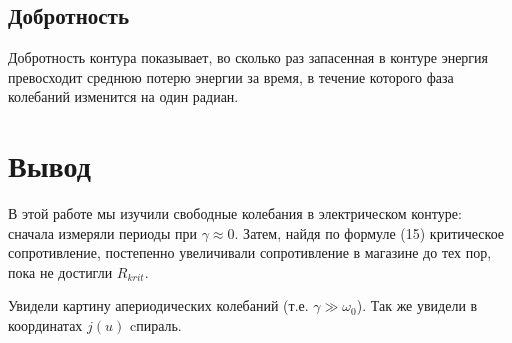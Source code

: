 \documentclass[a4paper, 14pt]{extarticle}
\begin{document}
\subsection{Добротность}
Добротность контура показывает, во сколько раз запасенная в контуре энергия превосходит среднюю потерю энергии  за время, в течение которого фаза колебаний изменится на один радиан.


\section{Вывод}

В этой работе мы изучили свободные колебания в электрическом контуре: сначала измеряли периоды при $ \gamma \approx 0 $.
Затем, найдя по формуле {(15)} критическое сопротивление, постепенно увеличивали сопротивление в магазине до тех пор, пока не достигли $R_{krit}$.

Увидели картину апериодических колебаний (т.е. ${\gamma \gg \omega_{0}}$).
\newline
Так же увидели в координатах $j(u)$ cпираль.
\end{document}
